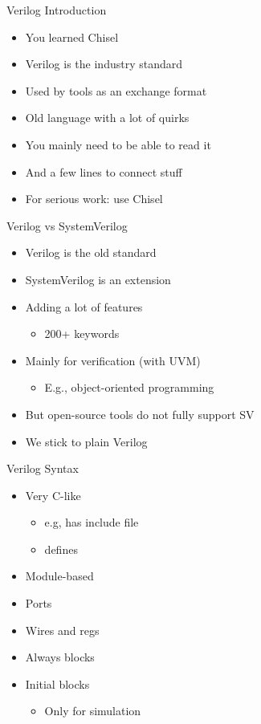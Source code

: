 \begin{frame}[fragile]{Verilog Introduction}
\begin{itemize}
\item You learned Chisel
\item Verilog is the industry standard 
\item Used by tools as an exchange format
\item Old language with a lot of quirks
\item You mainly need to be able to read it
\item And a few lines to connect stuff
\item For serious work: use Chisel
\end{itemize}
\end{frame}



\begin{frame}[fragile]{Verilog vs SystemVerilog}
\begin{itemize}
\item Verilog is the old standard
\item SystemVerilog is an extension
\item Adding a lot of features
\begin{itemize}
\item 200+ keywords
\end{itemize}
\item Mainly for verification (with UVM)
\begin{itemize}
\item E.g., object-oriented programming
\end{itemize}
\item But open-source tools do not fully support SV
\item We stick to plain Verilog
\end{itemize}
\end{frame}

\begin{frame}[fragile]{Verilog Syntax}
\begin{itemize}
\item Very C-like
\begin{itemize}
\item e.g, has include file
\item defines
\end{itemize}
\item Module-based
\item Ports
\item Wires and regs
\item Always blocks
\item Initial blocks
\begin{itemize}
\item Only for simulation
\end{itemize}
\end{itemize}
\end{frame}

